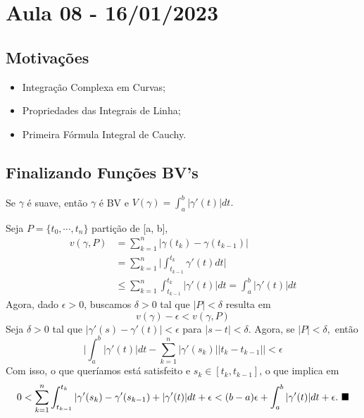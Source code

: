 \documentclass[complex.tex]{subfiles}
\begin{document}
\section{Aula 08 - 16/01/2023}
\subsection{Motivações}
\begin{itemize}
	\item Integração Complexa em Curvas;
	\item Propriedades das Integrais de Linha;
	\item Primeira Fórmula Integral de Cauchy.
\end{itemize}
\subsection{Finalizando Funções BV's}
\begin{prop*}
	Se $\gamma$ é suave, então $\gamma$ é BV e $V(\gamma) = \int_{a}^{b}|\gamma'(t)|dt.$
\end{prop*}
\begin{proof*}
	Seja $P=\{t_{0}, \cdots, t_n\} $ partição de [a, b],
	\begin{align*}
		v(\gamma, P) & = \sum\limits_{k=1}^{n}|\gamma(t_{k}) - \gamma(t_{k-1})|                                    \\
		             & = \sum\limits_{k=1}^{n}\biggl|\int_{t_{k-1}}^{t_{k}}\gamma'(t)dt\biggr|                     \\
		             & \leq \sum\limits_{k=1}^{n}\int_{t_{k-1}}^{t_{k}}|\gamma'(t)|dt = \int_{a}^{b}|\gamma'(t)|dt
	\end{align*}
	Agora, dado $\epsilon > 0$, buscamos $\delta > 0$ tal que $|P| < \delta$ resulta em
	$$
		v(\gamma) - \epsilon < v(\gamma, P)
	$$
	Seja $\delta > 0$ tal que $|\gamma'(s) - \gamma'(t)| < \epsilon$ para $|s - t| < \delta$. Agora, se $|P| < \delta,$ então
	$$
		\biggl|\int_{a}^{b}|\gamma'(t)|dt - \sum\limits_{k=1}^{n}|\gamma'(s_{k})||t_{k}-t_{k-1}|\biggr| < \epsilon
	$$
	Com isso, o que queríamos está satisfeito e $s_{k}\in{[t_{k}, t_{k-1}]}$, o que implica em
	$$
		0 < \sum\limits_{k=1}^{n}\int_{t_{k-1}}^{t_{k}}|\gamma'(s_{k}) - \gamma'(s_{k-1}) + |\gamma'(t)| dt + \epsilon < (b-a)\epsilon +
		\int_{a}^{b}|\gamma'(t)|dt + \epsilon. \text{ $\blacksquare$}
	$$
\end{proof*}
\end{document}
